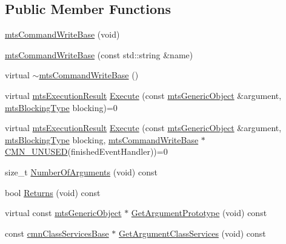 \subsection*{Public Member Functions}
\begin{DoxyCompactItemize}
\item 
\hyperlink{classmts_command_write_base_a6f4d5fca6143636b3f0b55c99e1807fb}{mts\-Command\-Write\-Base} (void)
\item 
\hyperlink{classmts_command_write_base_a5a7579b6022d48ba89fff9d4a757258e}{mts\-Command\-Write\-Base} (const std\-::string \&name)
\item 
virtual \hyperlink{classmts_command_write_base_afc6522de71949aa9a17fbbfed1b739a8}{$\sim$mts\-Command\-Write\-Base} ()
\item 
virtual \hyperlink{classmts_execution_result}{mts\-Execution\-Result} \hyperlink{classmts_command_write_base_ae0f9db1cdc228fe67c59b86994d28115}{Execute} (const \hyperlink{classmts_generic_object}{mts\-Generic\-Object} \&argument, \hyperlink{mts_forward_declarations_8h_ad7426ccb6c883bc780d0ee197dddcbe7}{mts\-Blocking\-Type} blocking)=0
\item 
virtual \hyperlink{classmts_execution_result}{mts\-Execution\-Result} \hyperlink{classmts_command_write_base_a2bf3f188291d690478be5452ba5ba42d}{Execute} (const \hyperlink{classmts_generic_object}{mts\-Generic\-Object} \&argument, \hyperlink{mts_forward_declarations_8h_ad7426ccb6c883bc780d0ee197dddcbe7}{mts\-Blocking\-Type} blocking, \hyperlink{classmts_command_write_base}{mts\-Command\-Write\-Base} $\ast$\hyperlink{cmn_portability_8h_a021894e2626935fa2305434b1e893ff6}{C\-M\-N\-\_\-\-U\-N\-U\-S\-E\-D}(finished\-Event\-Handler))=0
\item 
size\-\_\-t \hyperlink{classmts_command_write_base_a0654ecf1e52106edaa961f4dd9ad8272}{Number\-Of\-Arguments} (void) const 
\item 
bool \hyperlink{classmts_command_write_base_a69c98178df30cf4b2c3bd808c3616402}{Returns} (void) const 
\item 
virtual const \hyperlink{classmts_generic_object}{mts\-Generic\-Object} $\ast$ \hyperlink{classmts_command_write_base_aeb23012177ead24850c6d2f5f9d76015}{Get\-Argument\-Prototype} (void) const 
\item 
const \hyperlink{classcmn_class_services_base}{cmn\-Class\-Services\-Base} $\ast$ \hyperlink{classmts_command_write_base_a95228eaf116fb4f55922f21ad47ea3a6}{Get\-Argument\-Class\-Services} (void) const 
\end{DoxyCompactItemize}
